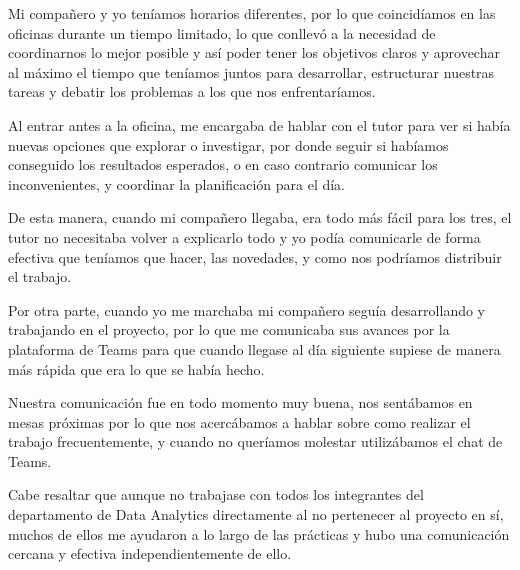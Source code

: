 Mi compañero y yo teníamos horarios diferentes, por lo que coincidíamos en las oficinas durante un tiempo limitado, lo que conllevó a la necesidad de coordinarnos lo mejor posible y así poder tener los objetivos claros y aprovechar al máximo el tiempo que teníamos juntos para desarrollar, estructurar nuestras tareas y debatir los problemas a los que nos enfrentaríamos. 

Al entrar antes a la oficina, me encargaba de hablar con el tutor para ver si había nuevas opciones que explorar o investigar, por donde seguir si habíamos conseguido los resultados esperados, o en caso contrario comunicar los inconvenientes, y coordinar la planificación para el día. 

De esta manera, cuando mi compañero llegaba, era todo más fácil para los tres, el tutor no necesitaba volver a explicarlo todo y yo podía comunicarle de forma efectiva que teníamos que hacer, las novedades, y como nos podríamos distribuir el trabajo. 

Por otra parte, cuando yo me marchaba mi compañero seguía desarrollando y trabajando en el proyecto, por lo que me comunicaba sus avances por la plataforma de Teams para que cuando llegase al día siguiente supiese de manera más rápida que era lo que se había hecho.

Nuestra comunicación fue en todo momento muy buena, nos sentábamos en mesas próximas por lo que nos acercábamos a hablar sobre como realizar el trabajo frecuentemente, y cuando no queríamos molestar utilizábamos el chat de Teams.

Cabe resaltar que aunque no trabajase con todos los integrantes del departamento de Data Analytics directamente al no pertenecer al proyecto en sí, muchos de ellos me ayudaron  a lo largo de las prácticas y hubo una comunicación cercana y efectiva independientemente de ello. 